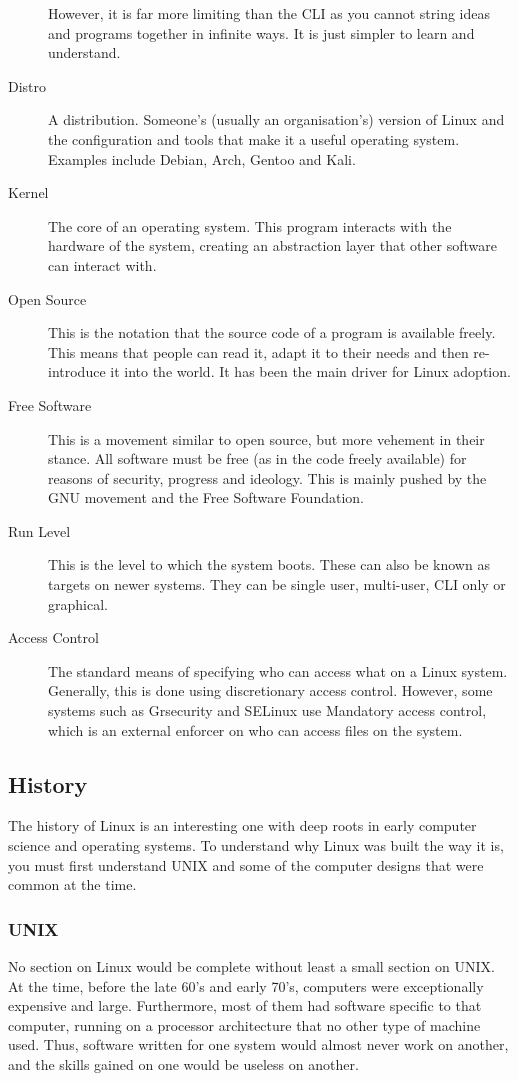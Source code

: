 \begin{description}
					However, it is far more limiting than the CLI as you cannot string ideas and programs together in infinite ways.
					It is just simpler to learn and understand.
				\item[Distro] A distribution. Someone's (usually an organisation's) version of Linux and the configuration and tools that make it a useful operating system.
					Examples include Debian, Arch, Gentoo and Kali.
				\item[Kernel] The core of an operating system.
					This program interacts with the hardware of the system, creating an abstraction layer that other software can interact with.
				\item[Open Source] This is the notation that the source code of a program is available freely.
					This means that people can read it, adapt it to their needs and then re-introduce it into the world.
					It has been the main driver for Linux adoption.
				\item[Free Software] This is a movement similar to open source, but more vehement in their stance.
					All software must be free (as in the code freely available) for reasons of security, progress and ideology.
					This is mainly pushed by the GNU movement and the Free Software Foundation.
				\item[Run Level] This is the level to which the system boots.
					These can also be known as targets on newer systems.
					They can be single user, multi-user, CLI only or graphical.
				\item[Access Control] The standard means of specifying who can access what on a Linux system.
					Generally, this is done using discretionary access control.
					However, some systems such as Grsecurity and SELinux use Mandatory access control, which is an external enforcer on who can access files on the system.
			\end{description}
		\subsection{History}
			The history of Linux is an interesting one with deep roots in early computer science and operating systems.
			To understand why Linux was built the way it is, you must first understand UNIX and some of the computer designs that were common at the time.
			\subsubsection{UNIX}
				No section on Linux would be complete without least a small section on UNIX.
				At the time, before the late 60's and early 70's, computers were exceptionally expensive and large.
				Furthermore, most of them had software specific to that computer, running on a processor architecture that no other type of machine used.
				Thus, software written for one system would almost never work on another,
				and the skills gained on one would be useless on another.

